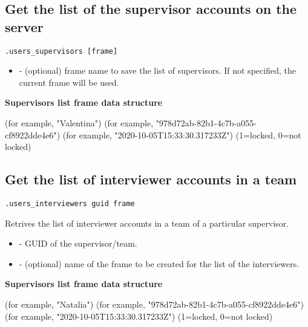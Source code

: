 \subsection{Get the list of the supervisor accounts on the server}
\begin{lstlisting}[style=CommandLineStyle]
.users_supervisors [frame]
\end{lstlisting}

\paramsheader
\begin{itemize}
\item {} - (optional) frame name to save the list of supervisors. If not specified, the current frame will be used.
\end{itemize}
\textbf{Supervisors list frame data structure}

\begin{compactitem}
     (for example, "Valentina")
     (for example, "978d72ab-82b1-4c7b-a055-cf8922dde4e6")
     (for example, "2020-10-05T15:33:30.317233Z")
     (1=locked, 0=not locked)
\end{compactitem}

\subsection{Get the list of interviewer accounts in a team}
\begin{lstlisting}[style=CommandLineStyle]
.users_interviewers guid frame
\end{lstlisting}
Retrives the list of interviewer accounts in a team of a particular supervisor.

\paramsheader
\begin{itemize}
  \item {} - GUID of the supervisor/team.
  \item {} - (optional) name of the frame to be created for the list of the interviewers.
\end{itemize}

\textbf{Supervisors list frame data structure}

\begin{compactitem}
     (for example, "Natalia")
     (for example, "978d72ab-82b1-4c7b-a055-cf8922dde4e6")
     (for example, "2020-10-05T15:33:30.317233Z")
     (1=locked, 0=not locked)
\end{compactitem}


